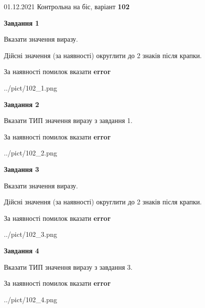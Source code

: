 \documentclass[11pt, ukrainian]{article}
\begin{document}
{01.12.2021 Контрольна на біс, варіант  \No \textbf { 102 }\par}
{
\begin {large}
{\begin {center}\textbf{Завдання 1}\end {center}}\par
Вказати значення виразу. \par
Дійсні значення (за наявності) округлити до 2 знаків після крапки. \par
За наявності помилок вказати \textbf{error}

\begin{center}
	{../pict/102_1.png}
\end{center}
\newpage

{\begin {center}\textbf{Завдання 2}\end {center}}\par
Вказати ТИП значення виразу з завдання 1. \par
За наявності помилок вказати \textbf{error}

\begin{center}
	{../pict/102_2.png}
\end{center}
\newpage

{\begin {center}\textbf{Завдання 3}\end {center}}\par
Вказати значення виразу. \par
Дійсні значення (за наявності) округлити до 2 знаків після крапки. \par
За наявності помилок вказати \textbf{error}

\begin{center}
	{../pict/102_3.png}
\end{center}
\newpage

{\begin {center}\textbf{Завдання 4}\end {center}}\par
Вказати ТИП значення виразу з завдання 3. \par
За наявності помилок вказати \textbf{error}

\begin{center}
	{../pict/102_4.png}
\end{center}
\newpage


\end{large}}
\end{document}
